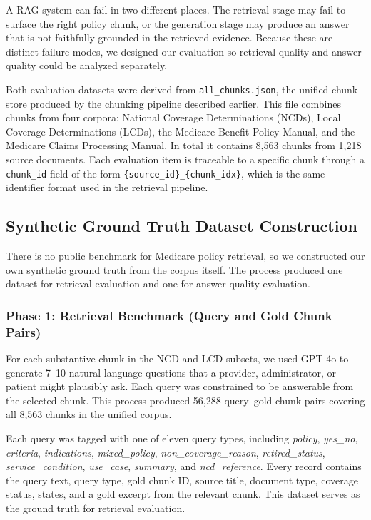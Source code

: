 \documentclass[10pt, letterpaper]{article}
\begin{document}
A RAG system can fail in two different places. The retrieval stage may fail to surface
the right policy chunk, or the generation stage may produce an answer that is not
faithfully grounded in the retrieved evidence. Because these are distinct failure modes,
we designed our evaluation so retrieval quality and answer quality could be analyzed
separately.

Both evaluation datasets were derived from \texttt{all\_chunks.json}, the unified chunk
store produced by the chunking pipeline described earlier. This file combines chunks
from four corpora: National Coverage Determinations (NCDs), Local Coverage
Determinations (LCDs), the Medicare Benefit Policy Manual, and the Medicare Claims
Processing Manual. In total it contains 8,563 chunks from 1,218 source documents. Each
evaluation item is traceable to a specific chunk through a \texttt{chunk\_id} field of
the form \texttt{\{source\_id\}\_\{chunk\_idx\}}, which is the same identifier format used
in the retrieval pipeline.

\subsection{Synthetic Ground Truth Dataset Construction}

There is no public benchmark for Medicare policy retrieval, so we constructed our own
synthetic ground truth from the corpus itself. The process produced one dataset for
retrieval evaluation and one for answer-quality evaluation.

\subsubsection{Phase 1: Retrieval Benchmark (Query and Gold Chunk Pairs)}

For each substantive chunk in the NCD and LCD subsets, we used GPT-4o to generate 7--10
natural-language questions that a provider, administrator, or patient might plausibly
ask. Each query was constrained to be answerable from the selected chunk. This process
produced 56,288 query--gold chunk pairs covering all 8,563 chunks in the unified
corpus.

Each query was tagged with one of eleven query types, including \textit{policy},
\textit{yes\_no}, \textit{criteria}, \textit{indications}, \textit{mixed\_policy},
\textit{non\_coverage\_reason}, \textit{retired\_status}, \textit{service\_condition},
\textit{use\_case}, \textit{summary}, and \textit{ncd\_reference}. Every record contains
the query text, query type, gold chunk ID, source title, document type, coverage
status, states, and a gold excerpt from the relevant chunk. This dataset serves as the
ground truth for retrieval evaluation.
\end{document}

